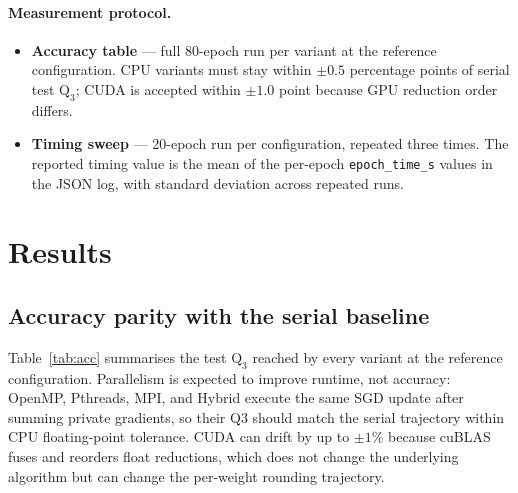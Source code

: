 \documentclass[11pt,a4paper]{article}
\begin{document}
\paragraph{Measurement protocol.}
\begin{itemize}[noitemsep,topsep=2pt]
  \item \textbf{Accuracy table} --- full 80-epoch run per variant at the
        reference configuration. CPU variants must stay within
        $\pm0.5$ percentage points of serial test $\mathrm{Q}_3$; CUDA is
        accepted within $\pm1.0$ point because GPU reduction order differs.
  \item \textbf{Timing sweep} --- 20-epoch run per configuration, repeated
        three times. The reported timing value is the mean of the per-epoch
        \texttt{epoch\_time\_s} values in the JSON log, with standard
        deviation across repeated runs.
\end{itemize}

\newpage
\section{Results}\label{sec:results}

\subsection{Accuracy parity with the serial baseline}\label{sec:acc}

Table~\ref{tab:acc} summarises the test $\mathrm{Q}_3$ reached by every
variant at the reference configuration. Parallelism is expected to improve
runtime, not accuracy: OpenMP, Pthreads, MPI, and Hybrid execute the same
SGD update after summing private gradients, so their Q3 should match the
serial trajectory within CPU floating-point tolerance. CUDA can drift by
up to $\pm 1\%$ because cuBLAS fuses and reorders float reductions, which
does not change the underlying algorithm but can change the per-weight
rounding trajectory.
\end{document}
